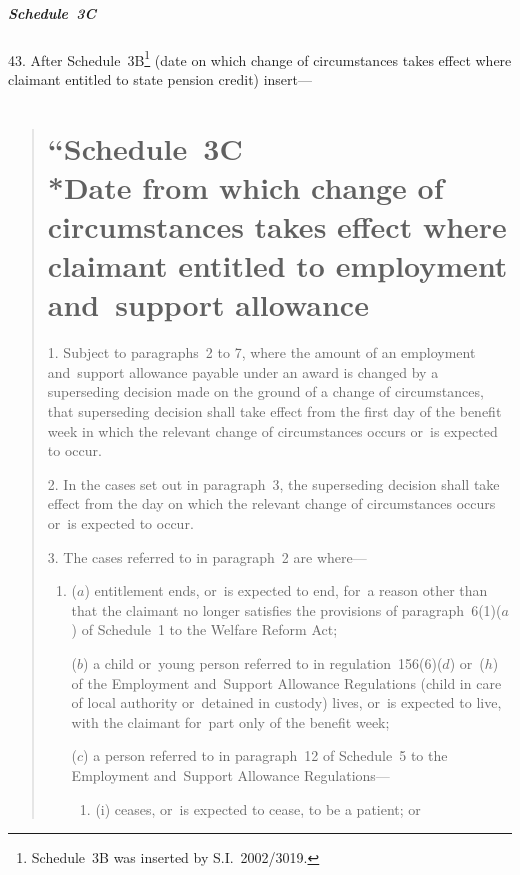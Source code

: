 \documentclass[12pt,a4paper]{article}
\begin{document}
\subsubsection[43. Schedule~3C]{Schedule~3C}

43.  After Schedule~3B\footnote{Schedule~3B was inserted by S.I.~2002/3019.} (date on which change of circumstances takes effect where claimant entitled to state pension credit) insert—
\begin{quotation}
\part*{\noindent ``Schedule~3C\\*Date from which change of circumstances takes effect where claimant entitled to employment and~support allowance}

1.  Subject to paragraphs~2 to 7, where the amount of an employment and~support allowance payable under an award is changed by a superseding decision made on the ground of a change of circumstances, that superseding decision shall take effect from the first day of the benefit week in which the relevant change of circumstances occurs or~is expected to occur.

\medskip

2.  In the cases set out in paragraph~3, the superseding decision shall take effect from the day on which the relevant change of circumstances occurs or~is expected to occur.

\medskip

3.  The cases referred to in paragraph~2 are where—
\begin{enumerate}\item[]
($a$) entitlement ends, or~is expected to end, for~a reason other than that the claimant no longer satisfies the provisions of paragraph~6(1)($a$)  of Schedule~1 to the Welfare Reform Act;

($b$) a child or~young person referred to in regulation~156(6)($d$)  or~($h$)  of the Employment and~Support Allowance Regulations (child in care of local authority or~detained in custody) lives, or~is expected to live, with the claimant for~part only of the benefit week;

($c$) a person referred to in paragraph~12 of Schedule~5 to the Employment and~Support Allowance Regulations—
\begin{enumerate}\item[]
(i) ceases, or~is expected to cease, to be a patient; or


\end{enumerate}
\end{enumerate}
\end{quotation}
\end{document}
